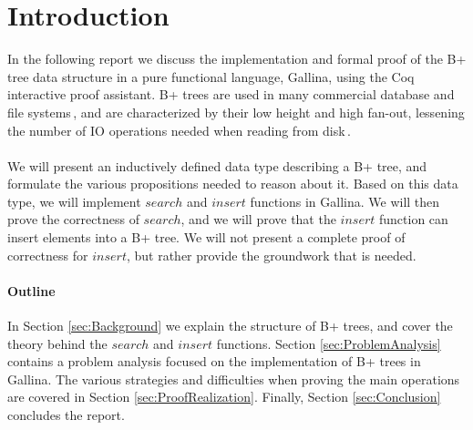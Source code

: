 \section{Introduction}
\label{sec:Introduction}
In the following report we discuss the implementation and formal proof of the B+ tree data structure in a pure functional language, Gallina, using the Coq interactive proof assistant. B+ trees are used in many commercial database and file systems\,\cite[p. 359]{ramakrishnan2003database}, and are characterized by their low height and high fan-out, lessening the number of IO operations needed when reading from disk\,\cite[pp. 344]{ramakrishnan2003database}.
\paragraph{}
We will present an inductively defined data type describing a B+ tree, and formulate the various propositions needed to reason about it. Based on this data type, we will implement $search$ and $insert$ functions in Gallina. We will then prove the correctness of $search$, and we will prove that the $insert$ function can insert elements into a B+ tree. We will not present a complete proof of correctness for $insert$, but rather provide the groundwork that is needed.
\paragraph{Outline}
In Section \ref{sec:Background} we explain the structure of B+ trees, and cover the theory behind the $search$ and $insert$ functions. Section \ref{sec:ProblemAnalysis} contains a problem analysis focused on the implementation of B+ trees in Gallina. The various strategies and difficulties when proving the main operations are covered in Section \ref{sec:ProofRealization}. Finally, Section \ref{sec:Conclusion} concludes the report.
